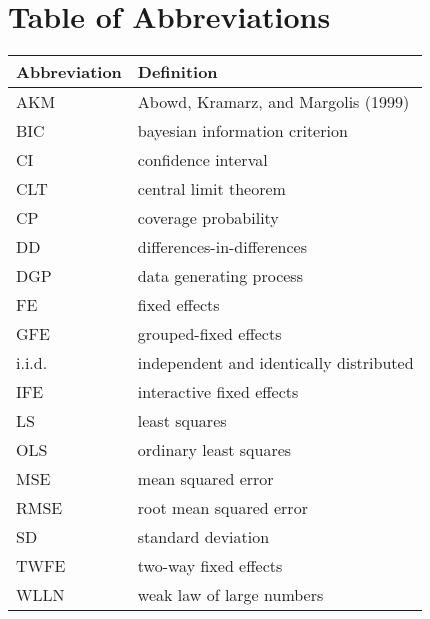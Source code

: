 \section*{Table of Abbreviations}
\begin{longtable}{l|l}
  \hline \hline
  \textbf{Abbreviation} & \textbf{Definition}\\
  \hline
  AKM & Abowd, Kramarz, and Margolis (1999)\\
  BIC & bayesian information criterion\\
  CI & confidence interval \\
  CLT & central limit theorem \\
  CP & coverage probability\\
  DD & differences-in-differences\\
  DGP & data generating process\\
  FE & fixed effects \\
  GFE & grouped-fixed effects\\
  i.i.d. & independent and identically distributed \\
  IFE & interactive fixed effects \\
  LS & least squares \\
  OLS & ordinary least squares\\
  MSE & mean squared error\\
  RMSE &root mean squared error\\
  SD & standard deviation\\
  TWFE & two-way fixed effects\\
  WLLN & weak law of large numbers
\end{longtable}